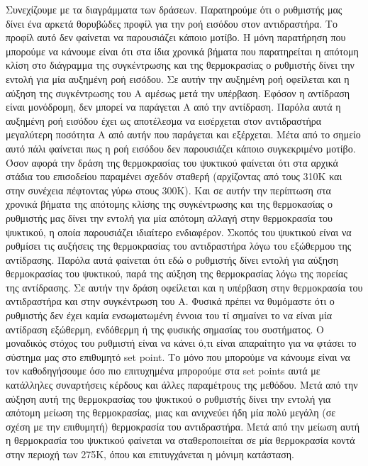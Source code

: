 \documentclass[11pt]{article} %
\numberwithin{equation}{subsection}
\begin{document}
Συνεχίζουμε με τα διαγράμματα των δράσεων. Παρατηρούμε ότι ο ρυθμιστής μας δίνει ένα αρκετά θορυβώδες προφίλ για την ροή εισόδου στον αντιδραστήρα. Το προφίλ αυτό δεν φαίνεται να παρουσιάζει κάποιο μοτίβο. Η μόνη παρατήρηση που μπορούμε να κάνουμε είναι ότι στα ίδια χρονικά βήματα που παρατηρείται η απότομη κλίση στο διάγραμμα της συγκέντρωσης και της θερμοκρασίας ο ρυθμιστής δίνει την εντολή για μία αυξημένη ροή εισόδου. Σε αυτήν την αυξημένη ροή οφείλεται και η αύξηση της συγκέντρωσης του Α αμέσως μετά την υπέρβαση. Εφόσον η αντίδραση είναι μονόδρομη, δεν μπορεί να παράγεται Α από την αντίδραση. Παρόλα αυτά η αυξημένη ροή εισόδου έχει ως αποτέλεσμα να εισέρχεται στον αντιδραστήρα μεγαλύτερη ποσότητα Α από αυτήν που παράγεται και εξέρχεται. Μέτα από το σημείο αυτό πάλι φαίνεται πως η ροή εισόδου δεν παρουσιάζει κάποιο συγκεκριμένο μοτίβο. Όσον αφορά την δράση της θερμοκρασίας του ψυκτικού φαίνεται ότι στα αρχικά στάδια του επισοδείου παραμένει σχεδόν σταθερή (αρχίζοντας από τους 310K και στην συνέχεια πέφτοντας γύρω στους 300K). Και σε αυτήν την περίπτωση στα χρονικά βήματα της απότομης κλίσης της συγκέντρωσης και της θερμοκασίας ο ρυθμιστής μας δίνει την εντολή για μία απότομη αλλαγή στην θερμοκρασία του ψυκτικού, η οποία παρουσιάζει ιδιαίτερο ενδιαφέρον. Σκοπός του ψυκτικού είναι να ρυθμίσει τις αυξήσεις της θερμοκρασίας του αντιδραστήρα λόγω του εξώθερμου της αντίδρασης. Παρόλα αυτά φαίνεται ότι εδώ ο ρυθμιστής δίνει εντολή για αύξηση θερμοκρασίας του ψυκτικού, παρά της αύξηση της θερμοκρασίας λόγω της πορείας της αντίδρασης. Σε αυτήν την δράση οφείλεται και η υπέρβαση στην θερμοκρασία του αντιδραστήρα και στην συγκέντρωση του Α. Φυσικά πρέπει να θυμόμαστε ότι ο ρυθμιστής δεν έχει καμία ενσωματωμένη έννοια του τί σημαίνει το να είναι μία αντίδραση εξώθερμη, ενδόθερμη ή της φυσικής σημασίας του συστήματος. Ο μοναδικός στόχος του ρυθμιστή είναι να κάνει ό,τι είναι απαραίτητο για να φτάσει το σύστημα μας στο επιθυμητό set point. Το μόνο που μπορούμε να κάνουμε είναι να τον καθοδηγήσουμε όσο πιο επιτυχημένα μπρορούμε στα set points αυτά με κατάλληλες συναρτήσεις κέρδους και άλλες παραμέτρους της μεθόδου. Μετά από την αύξηση αυτή της θερμοκρασίας του ψυκτικού ο ρυθμιστής δίνει την εντολή για απότομη μείωση της θερμοκρασίας, μιας και ανιχνεύει ήδη μία πολύ μεγάλη (σε σχέση με την επιθυμητή) θερμοκρασία του αντιδραστήρα. Μετά από την μείωση αυτή η θερμοκρασία του ψυκτικού φαίνεται να σταθεροποιείται σε μία θερμοκρασία κοντά στην περιοχή των 275Κ, όπου και επιτυγχάνεται η μόνιμη κατάσταση.\\
\end{document}
